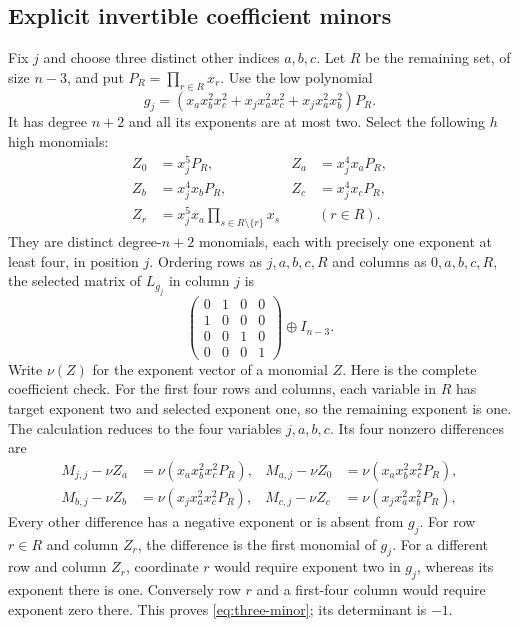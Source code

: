 \subsection{Explicit invertible coefficient minors}
Fix $j$ and choose three distinct other indices $a,b,c$. Let $R$ be the remaining set, of size $n-3$, and put $P_R=\prod_{r\in R}x_r$. Use the low polynomial
\[
g_j=(x_ax_b^2x_c^2+x_jx_a^2x_c^2+x_jx_a^2x_b^2)P_R.
\]
It has degree $n+2$ and all its exponents are at most two. Select the following $h$ high monomials:
\begin{equation}\label{eq:three-monomials}
\begin{aligned}
Z_0&=x_j^5P_R,&Z_a&=x_j^4x_aP_R,\\
Z_b&=x_j^4x_bP_R,&Z_c&=x_j^4x_cP_R,\\
Z_r&=x_j^5x_a\prod_{s\in R\setminus\{r\}}x_s
 &&(r\in R).
\end{aligned}
\end{equation}
They are distinct degree-$n+2$ monomials, each with precisely one exponent at least four, in position $j$. Ordering rows as $j,a,b,c,R$ and columns as $0,a,b,c,R$, the selected matrix of $L_{g_j}$ in column $j$ is
\begin{equation}\label{eq:three-minor}
\begin{pmatrix}
0&1&0&0\\1&0&0&0\\0&0&1&0\\0&0&0&1
\end{pmatrix}\oplus I_{n-3}.
\end{equation}
Write $\nu(Z)$ for the exponent vector of a monomial $Z$. Here is the complete coefficient check. For the first four rows and columns, each variable in $R$ has target exponent two and selected exponent one, so the remaining exponent is one. The calculation reduces to the four variables $j,a,b,c$. Its four nonzero differences are
\[
\begin{aligned}
M_{j,j}-\nu Z_a&=\nu(x_ax_b^2x_c^2P_R),&
M_{a,j}-\nu Z_0&=\nu(x_ax_b^2x_c^2P_R),\\
M_{b,j}-\nu Z_b&=\nu(x_jx_a^2x_c^2P_R),&
M_{c,j}-\nu Z_c&=\nu(x_jx_a^2x_b^2P_R),
\end{aligned}
\]
Every other difference has a negative exponent or is absent from $g_j$. For row $r\in R$ and column $Z_r$, the difference is the first monomial of $g_j$. For a different row and column $Z_r$, coordinate $r$ would require exponent two in $g_j$, whereas its exponent there is one. Conversely row $r$ and a first-four column would require exponent zero there. This proves \eqref{eq:three-minor}; its determinant is $-1$.

